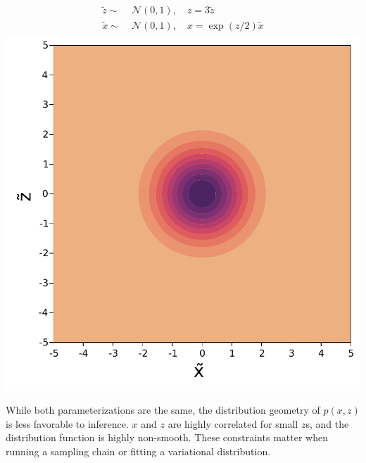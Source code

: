 \begin{minipage}{0.5\textwidth}
    \centering
    \begin{align}
        \begin{aligned}
            \tilde{z} \sim&\; \mathcal{N}(0, 1),\quad z = 3\tilde{z}\\
            \tilde{x} \sim&\; \mathcal{N}(0, 1),\quad x = \exp(z/2)\tilde{x}
        \end{aligned}
    \end{align}
    \includegraphics[width=\textwidth]{./chapters/1_introduction/figures/neals_funnel_non_centered.pdf}
    \label{fig:neals_noncentered}
\end{minipage}
\vspace{0.5cm}

While both parameterizations are the same, the distribution geometry of $p(x,z)$ is less favorable to inference.
$x$ and $z$ are highly correlated for small $z$s, and the distribution function is highly non-smooth.
These constraints matter when running a sampling chain or fitting a variational distribution.

